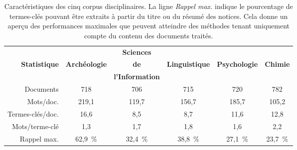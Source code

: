     \begin{table}
      \centering
      \begin{tabular}{@{~}r|c@{~~}c@{~~}c@{~~}c@{~~}c@{~}}
        \toprule
        & & \textbf{Sciences} & & &\\ \textbf{Statistique} & \textbf{Archéologie} & \textbf{de} & \textbf{Linguistique} & \textbf{Psychologie} & \textbf{Chimie}\\ & & \textbf{l'Information} & & &\\
        \hline
        Documents & 718 & 706 & 715 & 720 & 782\\
        Mots/doc. & 219,1 & 119,7 & 156,7 & 185,7 & 105,2\\
        Termes-clés/doc. & 16,6 & 8,5 & 8,7 & 11,6 & 12,8\\
        Mots/terme-clé & 1,3 & 1,7 & 1,8 & 1,6 & 2,2\\
        Rappel max. & 62,9~\% & 32,4~\% & 38,8~\% & 27,1~\% & 23,7~\%\\
        \bottomrule
      \end{tabular}
      \caption{Caractéristiques des cinq corpus disciplinaires. La ligne
               \textit{Rappel max.} indique le pourcentage de termes-clés
               pouvant être extraits à partir du titre ou du résumé des notices.
               Cela donne un aperçu des performances maximales que peuvent
               atteindre des méthodes tenant uniquement compte du contenu des
               documents traités.
               \label{tab:statistiques_des_corpus}}
    \end{table}

